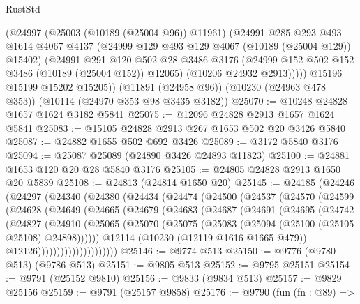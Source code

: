 \begin{lexlean}{RustStd}
\begin{coremodule}
          (@24997
            (@25003 (@10189 (@25004 @96)) @11961)
            (@24991
              @285
              @293
              @493
              @1614
              @4067
              @4137
              (@24999 @129 @493 @129 @4067 (@10189 (@25004 @129)) @15402)
              (@24991
                @291
                @120
                @502
                @28
                @3486
                @3176
                (@24999 @152 @502 @152 @3486 (@10189 (@25004 @152)) @12065)
                (@10206 @24932 @2913)))))
        @15196
        @15199
        @15202
        @15205))
    (@11891 (@24958 @96))
    (@10230 (@24963 @478 @353))
    (@10114 (@24970 @353 @98 @3435 @3182))
@25070 := @10248 @24828 @1657 @1624 @3182 @5841
@25075 := @12096 @24828 @2913 @1657 @1624 @5841
@25083 := @15105 @24828 @2913 @267 @1653 @502 @20 @3426 @5840
@25087 := @24882 @1655 @502 @692 @3426
@25089 := @3172 @5840 @3176
@25094 := @25087 @25089 (@24890 @3426 @24893 @11823)
@25100 := @24881 @1653 @120 @20 @28 @5840 @3176
@25105 := @24805 @24828 @2913 @1650 @20 @5839
@25108 := @24813 (@24814 @1650 @20)
@25145 := @24185
    (@24246
      (@24297
        (@24340
          (@24380
            (@24434
              (@24474
                (@24500
                  (@24537
                    (@24570
                      (@24599
                        (@24628
                          (@24649
                            (@24665
                              (@24679
                                (@24683
                                  (@24687
                                    (@24691
                                      (@24695
                                        (@24742
                                          (@24827
                                            (@24910
                                              (@25065
                                                (@25070
                                                  (@25075
                                                    (@25083
                                                      (@25094 (@25100 (@25105 @25108) @24898))))))
                                              @12114
                                              (@10230 (@12119 @1616 @1665 @479))
                                              @12126)))))))))))))))))))))
@25146 := @9774 @513
@25150 := @9776 (@9780 @513) (@9786 @513)
@25151 := @9805 @513
@25152 := @9795 @25151
@25154 := @9791 (@25152 @9810)
@25156 := @9833 (@9834 @513)
@25157 := @9829 @25156
@25159 := @9791 (@25157 @9858)
@25176 := @9790
    (fun (fn : @89) =>

\end{coremodule}
\end{lexlean}
